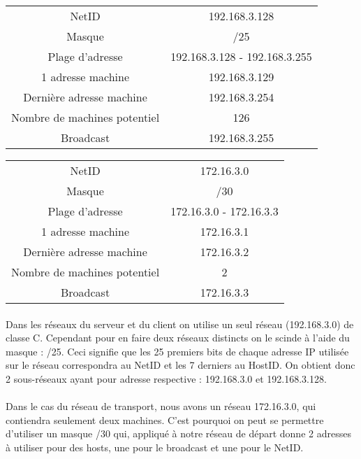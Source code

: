 \documentclass[12pt,a4paper,notitlepage]{article}
\begin{document}
\begin{center}
\begin{tabular}{|c|c|}
  \hline
  \rowcolor{orangec} \multicolumn{2}{|c|}{\cellcolor{bleup}Réseau du seveur} \\
  \hline
  NetID & 192.168.3.128 \\
  Masque & /25  \\
  Plage d'adresse & 192.168.3.128 - 192.168.3.255\\
  1\up{ère} adresse machine & 192.168.3.129\\
  Dernière adresse machine& 192.168.3.254\\
  Nombre de machines potentiel & 126\\
  Broadcast & 192.168.3.255\\
  \hline
\end{tabular}
\end{center}

\begin{center}
\begin{tabular}{|c|c|}
  \hline
  \rowcolor{orangec} \multicolumn{2}{|c|}{\cellcolor{bleup}Réseau de transport} \\
  \hline
  NetID & 172.16.3.0 \\
  Masque & /30  \\
  Plage d'adresse & 172.16.3.0 - 172.16.3.3\\
  1\up{ère} adresse machine & 172.16.3.1\\
  Dernière adresse machine&  172.16.3.2\\
  Nombre de machines potentiel & 2\\
  Broadcast & 172.16.3.3\\
  \hline
\end{tabular}
\end{center}

\paragraph{}Dans les réseaux du serveur et du client on utilise un seul réseau (192.168.3.0) de classe C. Cependant pour en faire deux réseaux distincts on le scinde à l'aide du masque : /25. Ceci signifie que les 25 premiers bits de chaque adresse IP utilisée sur le réseau correspondra au NetID et les 7 derniers au HostID. On obtient donc 2 sous-réseaux ayant pour adresse respective : 192.168.3.0 et 192.168.3.128.

\paragraph{}Dans le cas du réseau de transport, nous avons un réseau 172.16.3.0, qui contiendra seulement deux machines. C'est pourquoi on peut se permettre d'utiliser un masque /30 qui, appliqué à notre réseau de départ donne 2 adresses à utiliser pour des hosts, une pour le broadcast et une pour le NetID. 
\end{document}
